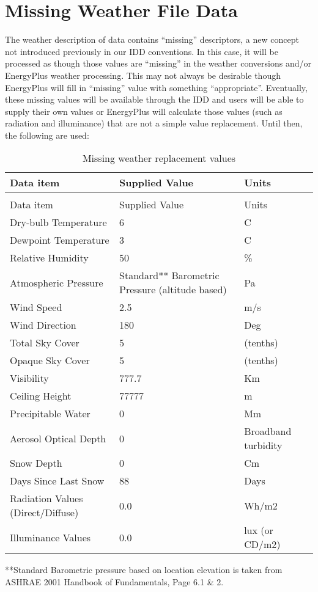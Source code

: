 \section{Missing Weather File Data}\label{missing-weather-file-data}

The weather description of data contains ``missing'' descriptors, a new concept not introduced previously in our IDD conventions. In this case, it will be processed as though those values are ``missing'' in the weather conversions and/or EnergyPlus weather processing. This may not always be desirable though EnergyPlus will fill in ``missing'' value with something ``appropriate''. Eventually, these missing values will be available through the IDD and users will be able to supply their own values or EnergyPlus will calculate those values (such as radiation and illuminance) that are not a simple value replacement. Until then, the following are used:

\begin{longtable}[c]{p{1.83in}p{2.67in}p{1.5in}}
\caption{Missing weather replacement values \label{table:missing-weather-replacement-values}} \tabularnewline
\toprule
Data item & Supplied Value & Units \tabularnewline
\midrule
\endfirsthead

\caption[]{Missing weather replacement values} \tabularnewline
\toprule
Data item & Supplied Value & Units \tabularnewline
\midrule
\endhead

Dry-bulb Temperature & 6 & C \tabularnewline
Dewpoint Temperature & 3 & C \tabularnewline
Relative Humidity & 50 & \% \tabularnewline
Atmospheric Pressure & Standard** Barometric Pressure (altitude based) & Pa \tabularnewline
Wind Speed & 2.5 & m/s \tabularnewline
Wind Direction & 180 & Deg \tabularnewline
Total Sky Cover & 5 & (tenths) \tabularnewline
Opaque Sky Cover & 5 & (tenths) \tabularnewline
Visibility & 777.7 & Km \tabularnewline
Ceiling Height & 77777 & m \tabularnewline
Precipitable Water & 0 & Mm \tabularnewline
Aerosol Optical Depth & 0 & Broadband turbidity \tabularnewline
Snow Depth & 0 & Cm \tabularnewline
Days Since Last Snow & 88 & Days \tabularnewline
Radiation Values (Direct/Diffuse) & 0.0 & Wh/m2 \tabularnewline
Illuminance Values & 0.0 & lux (or CD/m2) \tabularnewline
\bottomrule
\end{longtable}

**Standard Barometric pressure based on location elevation is taken from ASHRAE 2001 Handbook of Fundamentals, Page 6.1 \& 2.